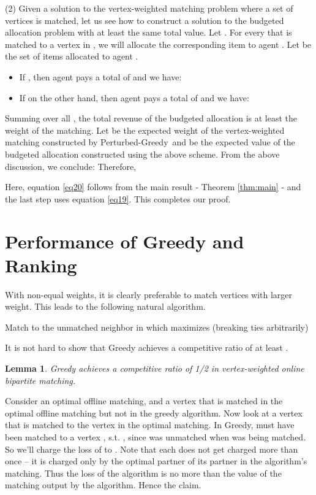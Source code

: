 \documentclass[11pt]{article}
\newtheorem{lemma}[theorem]{Lemma}
\newcommand{\qed}{}
\newcommand{\greedy}{{\sc Greedy}}
\newcommand{\pgreedy}{{\sc Perturbed-Greedy}}
\newenvironment{proof}{\noindent{\em Proof:}}{\hfill \qed \medskip}
\begin{document}
\begin{proof}
\noindent (2) Given a solution to the vertex-weighted matching problem where a set  of vertices is matched, let us see how to construct a solution to the budgeted allocation problem with at least the same total value. Let . For every  that is matched to a vertex in , we will allocate the corresponding item to agent . Let  be the set of items allocated to agent . 
\begin{itemize}
\item If , then agent  pays a total of  and we have:  
\item If on the other hand,  then agent  pays a total of  and we have: 
\end{itemize}
Summing over all , the total revenue of the budgeted allocation is at least the weight of the matching. Let  be the expected weight of the vertex-weighted matching constructed by \pgreedy~and  be the expected value of the budgeted allocation constructed using the above scheme. From the above discussion, we conclude:
Therefore, 
 

Here, equation \eqref{eq20} follows from the main result - Theorem \ref{thm:main} - and the last step uses equation \eqref{eq19}. This completes our proof.

\end{proof}

\section{Performance of {\sc Greedy} and {\sc Ranking}}
\label{app3}
With non-equal weights, it is clearly preferable to match vertices with larger weight. This
leads to the following natural algorithm.\\

\begin{algorithm}[H]
\caption{{\sc Greedy}}
{
	Match  to the unmatched neighbor in  which maximizes  (breaking ties arbitrarily)\;
}
\end{algorithm}

It is not hard to show that {\sc Greedy} achieves a competitive ratio
of at least . 

\begin{lemma}
{\sc Greedy} achieves a competitive ratio of 1/2 in vertex-weighted online bipartite matching.
\end{lemma}
\begin{proof}
Consider an optimal offline matching, and a vertex  that is
matched in the optimal offline matching but not in the greedy
algorithm. Now look at a vertex  that is matched to the
vertex  in the optimal matching.  In \greedy,  must have been
matched to a vertex , s.t. , since  was
unmatched when  was being matched. So we'll charge the loss of
 to . Note that each  does not get charged more than
once -- it is charged only by the optimal partner of its partner in
the algorithm's matching. Thus the loss of the algorithm is no more
than the value of the matching output by the algorithm. Hence the
claim.
\end{proof}
\end{document}
